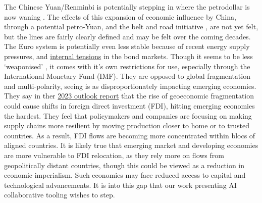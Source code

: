 The Chinese Yuan/Renminbi is potentially stepping in where the petrodollar is now waning \cite{mathews2018china}. The effects of this expansion of economic influence by China, through a potential petro-Yuan, and the belt and road initiative \cite{huang2016understanding}, are not yet felt, but the lines are fairly clearly defined and may be felt over the coming decades. The Euro system is potentially even less stable because of recent energy supply pressures, and \href{https://www.fitchratings.com/research/sovereigns/energy-crisis-increases-fiscal-risks-to-western-europe-sovereigns-23-09-2022}{internal tensions} in the bond markets. Though it seems to be less `weaponised' \cite{hudson2021destiny}, it comes with it's own restrictions for use, especially through the International Monetary Fund (IMF). They are opposed to global fragmentation and multi-polarity, seeing is as disproportionately impacting emerging economies. They say in ther \href{https://www.imf.org/en/Publications/WEO/Issues/2023/04/11/world-economic-outlook-april-2023?cid=bl-com-spring2023flagships-WEOEA2023001}{2023 outlook report} that the rise of geoeconomic fragmentation could cause shifts in foreign direct investment (FDI), hitting emerging economies the hardest. They feel that policymakers and companies are focusing on making supply chains more resilient by moving production closer to home or to trusted countries. As a result, FDI flows are becoming more concentrated within blocs of aligned countries. It is likely true that emerging market and developing economies are more vulnerable to FDI relocation, as they rely more on flows from geopolitically distant countries, though this could be viewed as a reduction in economic imperialism. Such economies may face reduced access to capital and technological advancements. It is into this gap that our work presenting AI collaborative tooling wishes to step.\par
